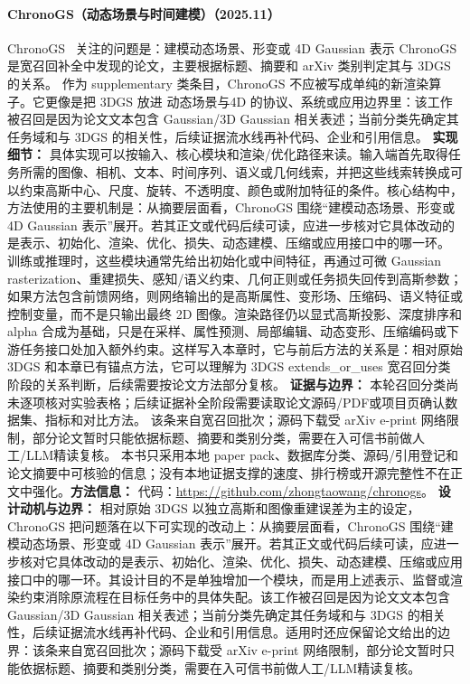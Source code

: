 \paragraph{ChronoGS（动态场景与时间建模）（2025.11）}
ChronoGS~\cite{2511_18794} 关注的问题是：建模动态场景、形变或 4D Gaussian 表示 ChronoGS 是宽召回补全中发现的论文，主要根据标题、摘要和 arXiv 类别判定其与 3DGS 的关系。
作为 supplementary 类条目，ChronoGS 不应被写成单纯的新渲染算子。它更像是把 3DGS 放进 动态场景与4D 的协议、系统或应用边界里：该工作被召回是因为论文文本包含 Gaussian/3D Gaussian 相关表述；当前分类先确定其任务域和与 3DGS 的相关性，后续证据流水线再补代码、企业和引用信息。
\textbf{实现细节：} 具体实现可以按输入、核心模块和渲染/优化路径来读。输入端首先取得任务所需的图像、相机、文本、时间序列、语义或几何线索，并把这些线索转换成可以约束高斯中心、尺度、旋转、不透明度、颜色或附加特征的条件。核心结构中，方法使用的主要机制是：从摘要层面看，ChronoGS 围绕“建模动态场景、形变或 4D Gaussian 表示”展开。若其正文或代码后续可读，应进一步核对它具体改动的是表示、初始化、渲染、优化、损失、动态建模、压缩或应用接口中的哪一环。 训练或推理时，这些模块通常先给出初始化或中间特征，再通过可微 Gaussian rasterization、重建损失、感知/语义约束、几何正则或任务损失回传到高斯参数；如果方法包含前馈网络，则网络输出的是高斯属性、变形场、压缩码、语义特征或控制变量，而不是只输出最终 2D 图像。渲染路径仍以显式高斯投影、深度排序和 alpha 合成为基础，只是在采样、属性预测、局部编辑、动态变形、压缩编码或下游任务接口处加入额外约束。这样写入本章时，它与前后方法的关系是：相对原始 3DGS 和本章已有锚点方法，它可以理解为 3DGS extends\_or\_uses 宽召回分类阶段的关系判断，后续需要按论文方法部分复核。
\textbf{证据与边界：} 本轮召回分类尚未逐项核对实验表格；后续证据补全阶段需要读取论文源码/PDF或项目页确认数据集、指标和对比方法。 该条来自宽召回批次；源码下载受 arXiv e-print 网络限制，部分论文暂时只能依据标题、摘要和类别分类，需要在入可信书前做人工/LLM精读复核。 本书只采用本地 paper pack、数据库分类、源码/引用登记和论文摘要中可核验的信息；没有本地证据支撑的速度、排行榜或开源完整性不在正文中强化。\textbf{方法信息：} 代码：\url{https://github.com/zhongtaowang/chronogs}。
\textbf{设计动机与边界：} 相对原始 3DGS 以独立高斯和图像重建误差为主的设定，ChronoGS 把问题落在以下可实现的改动上：从摘要层面看，ChronoGS 围绕“建模动态场景、形变或 4D Gaussian 表示”展开。若其正文或代码后续可读，应进一步核对它具体改动的是表示、初始化、渲染、优化、损失、动态建模、压缩或应用接口中的哪一环。其设计目的不是单独增加一个模块，而是用上述表示、监督或渲染约束消除原流程在目标任务中的具体失配。该工作被召回是因为论文文本包含 Gaussian/3D Gaussian 相关表述；当前分类先确定其任务域和与 3DGS 的相关性，后续证据流水线再补代码、企业和引用信息。适用时还应保留论文给出的边界：该条来自宽召回批次；源码下载受 arXiv e-print 网络限制，部分论文暂时只能依据标题、摘要和类别分类，需要在入可信书前做人工/LLM精读复核。
